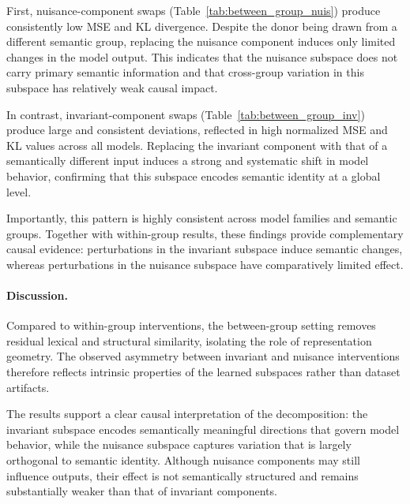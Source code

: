 First, nuisance-component swaps (Table~\ref{tab:between_group_nuis}) produce consistently low MSE and KL divergence. Despite the donor being drawn from a different semantic group, replacing the nuisance component induces only limited changes in the model output. This indicates that the nuisance subspace does not carry primary semantic information and that cross-group variation in this subspace has relatively weak causal impact.

In contrast, invariant-component swaps (Table~\ref{tab:between_group_inv}) produce large and consistent deviations, reflected in high normalized MSE and KL values across all models. Replacing the invariant component with that of a semantically different input induces a strong and systematic shift in model behavior, confirming that this subspace encodes semantic identity at a global level.

Importantly, this pattern is highly consistent across model families and semantic groups. Together with within-group results, these findings provide complementary causal evidence: perturbations in the invariant subspace induce semantic changes, whereas perturbations in the nuisance subspace have comparatively limited effect.

\paragraph{Discussion.}
Compared to within-group interventions, the between-group setting removes residual lexical and structural similarity, isolating the role of representation geometry. The observed asymmetry between invariant and nuisance interventions therefore reflects intrinsic properties of the learned subspaces rather than dataset artifacts.

The results support a clear causal interpretation of the decomposition: the invariant subspace encodes semantically meaningful directions that govern model behavior, while the nuisance subspace captures variation that is largely orthogonal to semantic identity. Although nuisance components may still influence outputs, their effect is not semantically structured and remains substantially weaker than that of invariant components.